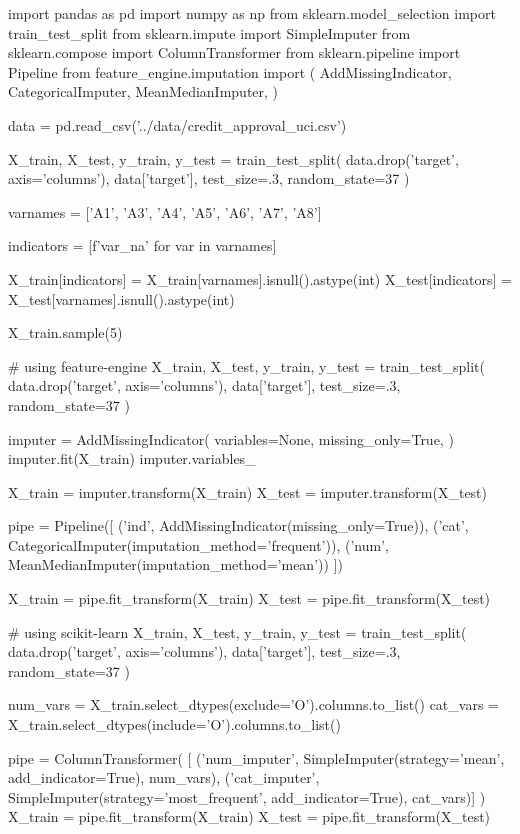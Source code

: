 \begin{pyc}
import pandas as pd
import numpy as np
from sklearn.model_selection import train_test_split
from sklearn.impute import SimpleImputer
from sklearn.compose import ColumnTransformer
from sklearn.pipeline import Pipeline
from feature_engine.imputation import (
    AddMissingIndicator,
    CategoricalImputer,
    MeanMedianImputer,
)

data = pd.read_csv('../data/credit_approval_uci.csv')

X_train, X_test, y_train, y_test = train_test_split(
    data.drop('target', axis='columns'), data['target'],
    test_size=.3, random_state=37
)

varnames = ['A1', 'A3', 'A4', 'A5', 'A6', 'A7', 'A8']

indicators = [f'{var}_na' for var in varnames]

X_train[indicators] = X_train[varnames].isnull().astype(int)
X_test[indicators] = X_test[varnames].isnull().astype(int)

X_train.sample(5)

# using feature-engine
X_train, X_test, y_train, y_test = train_test_split(
    data.drop('target', axis='columns'), data['target'],
    test_size=.3, random_state=37
)

imputer = AddMissingIndicator(
    variables=None,
    missing_only=True,
)
imputer.fit(X_train)
imputer.variables_

X_train = imputer.transform(X_train)
X_test = imputer.transform(X_test)

pipe = Pipeline([
    ('ind', AddMissingIndicator(missing_only=True)),
    ('cat', CategoricalImputer(imputation_method='frequent')),
    ('num', MeanMedianImputer(imputation_method='mean'))
])

X_train = pipe.fit_transform(X_train)
X_test = pipe.fit_transform(X_test)

# using scikit-learn
X_train, X_test, y_train, y_test = train_test_split(
    data.drop('target', axis='columns'), data['target'],
    test_size=.3, random_state=37
)

num_vars = X_train.select_dtypes(exclude='O').columns.to_list()
cat_vars = X_train.select_dtypes(include='O').columns.to_list()

pipe = ColumnTransformer(
    [
        ('num_imputer', 
            SimpleImputer(strategy='mean', 
                        add_indicator=True),
            num_vars),
        ('cat_imputer',
            SimpleImputer(strategy='most_frequent',
                        add_indicator=True),
            cat_vars)]
)
X_train = pipe.fit_transform(X_train)
X_test = pipe.fit_transform(X_test)
\end{pyc}

